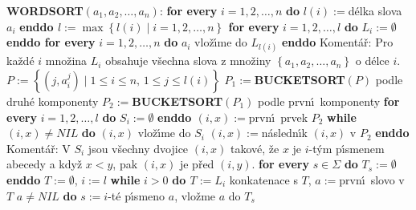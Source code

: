 {\bf WORDSORT$\left(a_1,a_2,\dots,a_n\right)$}:\newline 
{\bf for every} $i=1,2,\dots,n$ {\bf do} $l\left(i\right):=$d\'elka slova $a_
i$ {\bf enddo\newline 
$l:=\max\left\{l\left(i\right)\mid i=1,2,\dots,n\right\}$\newline 
for every} $i=1,2,\dots,l$ {\bf do} $L_i:=\emptyset$ {\bf enddo\newline 
for every} $i=1,2,\dots,n$ {\bf do}\newline 
\phantom{---}$a_i$ vlo\v z\'\i me do $L_{l\left(i\right)}$\newline 
{\bf enddo}\newline 
Koment\'a\v r: Pro ka\v zd\'e $i$ mno\v zina $L_i$ obsahuje v\v sechna slova z mno\v ziny 
$\left\{a_1,a_2,\dots,a_n\right\}$ o d\'elce $i$.\newline 
$P:=\left\{\left(j,a_i^j\right)\mid 1\le i\le n,\,1\le j\le l\left(i\right)\right\}$\newline 
$P_1:=${\bf BUCKETSORT$\left(P\right)$} podle druh\'e komponenty\newline 
$P_2:=${\bf BUCKETSORT$\left(P_1\right)$} podle prvn\'\i\ komponenty\newline
{\bf for every} $i=1,2,\dots,l$ {\bf do} $S_i:=\emptyset$ {\bf enddo\newline 
$\left(i,x\right):=$}prvn\'\i\ prvek $P_2$\newline 
{\bf while} $\left(i,x\right)\ne NIL$ {\bf do}\newline 
\phantom{---}$\left(i,x\right)$ vlo\v z\'\i me do $S_i$\newline 
\phantom{---}$\left(i,x\right):=$n\'asledn\'\i k $\left(i,x\right)$ v $P_2$\newline 
{\bf enddo\newline}
Koment\'a\v r: V $S_i$ jsou v\v sechny dvojice $\left(i,x\right)$ takov\'e, \v ze $x$ 
je $i$-t\'ym p\'\i smenem abecedy a kdy\v z $x<y$, pak $\left(i,x\right)$ je 
p\v red $\left(i,y\right)$.\newline 
{\bf for every} $s\in\Sigma$ {\bf do} $T_s:=\emptyset$ {\bf enddo}\newline 
$T:=\emptyset$, $i:=l$\newline 
{\bf while} $i>0$ {\bf do\newline 
\phantom{---}$T:=L_i$} konkatenace s $T$, $a:=$prvn\'\i\ slovo v $T$\newline 
\phantom{---}{\bf while} $a\ne NIL$ {\bf do}\newline 
\phantom{------}$s:=i$-t\'e p\'\i smeno $a$, vlo\v zme $a$ do $T_s$\newline 
